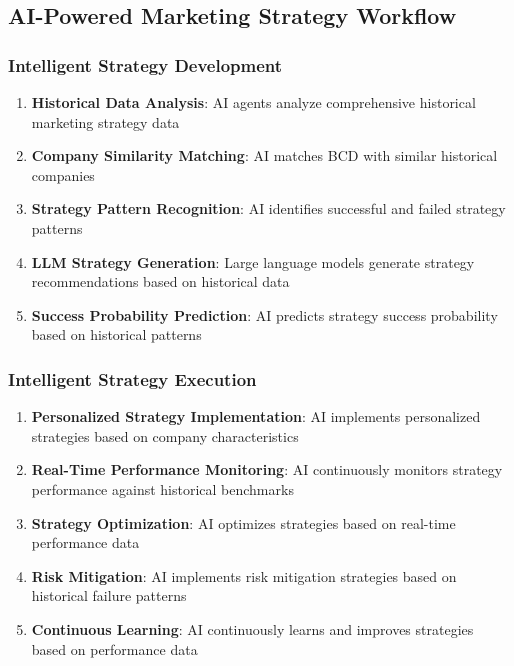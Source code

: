 \subsection{AI-Powered Marketing Strategy Workflow}

\subsubsection{Intelligent Strategy Development}

\begin{enumerate}
    \item \textbf{Historical Data Analysis}: AI agents analyze comprehensive historical marketing strategy data
    \item \textbf{Company Similarity Matching}: AI matches BCD with similar historical companies
    \item \textbf{Strategy Pattern Recognition}: AI identifies successful and failed strategy patterns
    \item \textbf{LLM Strategy Generation}: Large language models generate strategy recommendations based on historical data
    \item \textbf{Success Probability Prediction}: AI predicts strategy success probability based on historical patterns
\end{enumerate}

\subsubsection{Intelligent Strategy Execution}

\begin{enumerate}
    \item \textbf{Personalized Strategy Implementation}: AI implements personalized strategies based on company characteristics
    \item \textbf{Real-Time Performance Monitoring}: AI continuously monitors strategy performance against historical benchmarks
    \item \textbf{Strategy Optimization}: AI optimizes strategies based on real-time performance data
    \item \textbf{Risk Mitigation}: AI implements risk mitigation strategies based on historical failure patterns
    \item \textbf{Continuous Learning}: AI continuously learns and improves strategies based on performance data
\end{enumerate}

